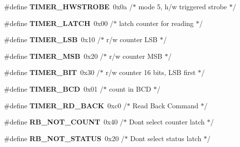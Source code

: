 \begin{DoxyCompactItemize}
\mbox{\label{group__RTEMSBSPsI386_ga8f41ce3ff9a0402bfe49c24144005991}} 
\#define {\bfseries T\+I\+M\+E\+R\+\_\+\+H\+W\+S\+T\+R\+O\+BE}~0x0a            /$\ast$ mode 5, h/w triggered strobe   $\ast$/
\item 
\mbox{\label{group__RTEMSBSPsI386_gad9c7b96537eed7598dc258a3c47377d8}} 
\#define {\bfseries T\+I\+M\+E\+R\+\_\+\+L\+A\+T\+CH}~0x00            /$\ast$ latch counter for reading      $\ast$/
\item 
\mbox{\label{group__RTEMSBSPsI386_gac18cb814ebd0d67235392c330e0e3504}} 
\#define {\bfseries T\+I\+M\+E\+R\+\_\+\+L\+SB}~0x10            /$\ast$ r/w counter L\+S\+B                $\ast$/
\item 
\mbox{\label{group__RTEMSBSPsI386_ga2a8a6d363c612d756cd8d78480f7cd04}} 
\#define {\bfseries T\+I\+M\+E\+R\+\_\+\+M\+SB}~0x20            /$\ast$ r/w counter M\+S\+B                $\ast$/
\item 
\mbox{\label{group__RTEMSBSPsI386_ga8625ef46b29b0eb120042695f9610c87}} 
\#define {\bfseries T\+I\+M\+E\+R\+\_\+B\+IT}~0x30            /$\ast$ r/w counter 16 bits, L\+S\+B first $\ast$/
\item 
\mbox{\label{group__RTEMSBSPsI386_ga325b992a371d5d981c4eceff42fa5956}} 
\#define {\bfseries T\+I\+M\+E\+R\+\_\+\+B\+CD}~0x01            /$\ast$ count in B\+C\+D                   $\ast$/
\item 
\mbox{\label{group__RTEMSBSPsI386_ga471f98d5ccd4f8380fa409de0743b6ae}} 
\#define {\bfseries T\+I\+M\+E\+R\+\_\+\+R\+D\+\_\+\+B\+A\+CK}~0xc0	       /$\ast$ Read Back Command 		 $\ast$/
\item 
\mbox{\label{group__RTEMSBSPsI386_ga6480063e20b42b37e078a8a8610c0ae7}} 
\#define {\bfseries R\+B\+\_\+\+N\+O\+T\+\_\+\+C\+O\+U\+NT}~0x40	       /$\ast$ Don\textquotesingle{}t select counter latch 	 $\ast$/
\item 
\mbox{\label{group__RTEMSBSPsI386_gaf2ae91adfcb0c8aaf3d222178e842b58}} 
\#define {\bfseries R\+B\+\_\+\+N\+O\+T\+\_\+\+S\+T\+A\+T\+US}~0x20	       /$\ast$ Don\textquotesingle{}t select status latch 	 $\ast$/

\end{DoxyCompactItemize}
